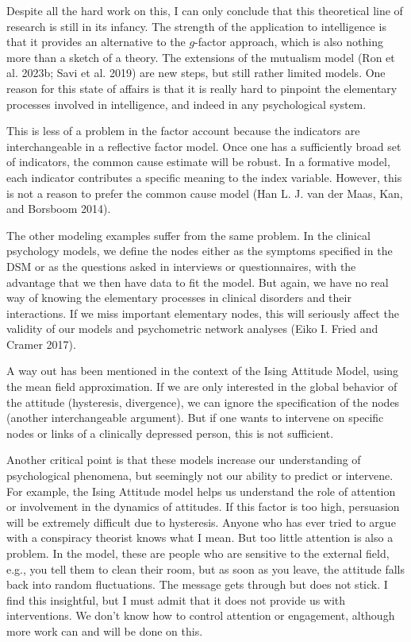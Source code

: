 \documentclass[
  a4paper,
  DIV=11,
  numbers=noendperiod,
  oneside]{scrreprt}
\begin{document}
Despite all the hard work on this, I can only conclude that this
theoretical line of research is still in its infancy. The strength of
the application to intelligence is that it provides an alternative to
the \(g\)-factor approach, which is also nothing more than a sketch of a
theory. The extensions of the mutualism model (Ron et al. 2023b; Savi et
al. 2019) are new steps, but still rather limited models. One reason for
this state of affairs is that it is really hard to pinpoint the
elementary processes involved in intelligence, and indeed in any
psychological system.

This is less of a problem in the factor account because the indicators
are interchangeable in a reflective factor model. Once one has a
sufficiently broad set of indicators, the common cause estimate will be
robust. In a formative model, each indicator contributes a specific
meaning to the index variable. However, this is not a reason to prefer
the common cause model (Han L. J. van der Maas, Kan, and Borsboom 2014).

The other modeling examples suffer from the same problem. In the
clinical psychology models, we define the nodes either as the symptoms
specified in the DSM or as the questions asked in interviews or
questionnaires, with the advantage that we then have data to fit the
model. But again, we have no real way of knowing the elementary
processes in clinical disorders and their interactions. If we miss
important elementary nodes, this will seriously affect the validity of
our models and psychometric network analyses (Eiko I. Fried and Cramer
2017).

A way out has been mentioned in the context of the Ising Attitude Model,
using the mean field approximation. If we are only interested in the
global behavior of the attitude (hysteresis, divergence), we can ignore
the specification of the nodes (another interchangeable argument). But
if one wants to intervene on specific nodes or links of a clinically
depressed person, this is not sufficient.

Another critical point is that these models increase our understanding
of psychological phenomena, but seemingly not our ability to predict or
intervene. For example, the Ising Attitude model helps us understand the
role of attention or involvement in the dynamics of attitudes. If this
factor is too high, persuasion will be extremely difficult due to
hysteresis. Anyone who has ever tried to argue with a conspiracy
theorist knows what I mean. But too little attention is also a problem.
In the model, these are people who are sensitive to the external field,
e.g., you tell them to clean their room, but as soon as you leave, the
attitude falls back into random fluctuations. The message gets through
but does not stick. I find this insightful, but I must admit that it
does not provide us with interventions. We don't know how to control
attention or engagement, although more work can and will be done on
this.
\end{document}
